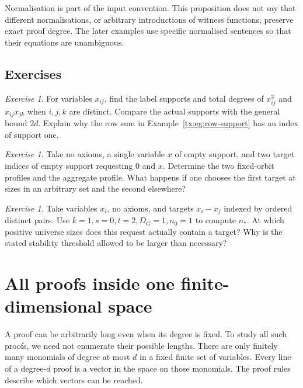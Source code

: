 \documentclass[11pt,a4paper,oneside,openany]{book}
\theoremstyle{definition}\newtheorem{definition}[theorem]{Definition}
\theoremstyle{remark}\newtheorem{remark}[theorem]{Remark}
\newtheorem{exercise}[theorem]{Exercise}
\numberwithin{equation}{chapter}
\begin{document}
Normalisation is part of the input convention. This proposition does
not say that different normalisations, or arbitrary introductions of
witness functions, preserve exact proof degree. The later examples use
specific normalised sentences so that their equations are unambiguous.

\section{Exercises}
\begin{exercise}\label{tx:ex:support-count}
For variables $x_{ij}$, find the label supports and total degrees of
$x_{ij}^3$ and $x_{ij}x_{jk}$ when $i,j,k$ are distinct. Compare the
actual supports with the general bound $2d$. Explain why the row sum
in Example~\ref{tx:eg:row-support} has an index of support one.
\end{exercise}
\par\medskip

\begin{exercise}\label{tx:ex:orbit-switch}
Take no axioms, a single variable $x$ of empty support, and two target
indices of empty support requesting $0$ and $x$. Determine the two
fixed-orbit profiles and the aggregate profile. What happens if one
chooses the first target at sizes in an arbitrary set and the second
elsewhere?
\end{exercise}
\par\medskip

\begin{exercise}\label{tx:ex:stable-floor}
Take variables $x_i$, no axioms, and targets $x_i-x_j$ indexed by
ordered distinct pairs. Use $k=1,s=0,t=2,D_G=1,n_0=1$ to compute $n_*$.
At which positive universe sizes does this request actually contain a target?
Why is the stated stability threshold allowed to be larger than necessary?
\end{exercise}
\par\medskip


\chapter{All proofs inside one finite-dimensional space}\label{tx:ch:closure}\label{tx:sec:pc-space}
A proof can be arbitrarily long even when its degree is fixed. To study
all such proofs, we need not enumerate their possible lengths. There
are only finitely many monomials of degree at most $d$ in a fixed finite
set of variables. Every line of a degree-$d$ proof is a vector in the
space on those monomials. The proof rules describe which vectors can
be reached.
\end{document}
